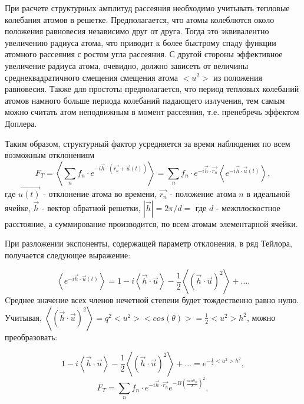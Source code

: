 
При расчете структурных амплитуд рассеяния необходимо учитывать
тепловые колебания атомов в решетке. Предполагается, что атомы колеблются около положения
равновесия независимо друг от друга. Тогда это эквивалентно увеличению радиуса атома,
что приводит к более быстрому спаду функции атомного рассеяния с ростом угла рассеяния.
С другой стороны эффективное увеличение радиуса атома, очевидно, должно зависеть от
величины среднеквадратичного смещения смещения атома  $<u^2>$ из положения равновесия.
Также для простоты предполагается, что период тепловых колебаний атомов намного больше периода
колебаний падающего излучения, тем самым можно считать атом неподвижным в момент рассеяния,
т.е. пренебречь эффектом Доплера.

Таким образом, структурный фактор усредняется за время наблюдения по всем возможным отклонениям
\begin{equation}
  F_T = \left\langle \sum_{n} f_n \cdot  e^{-i\vec {h} \cdot (\vec{r_n}+ \vec{u}(t))} \right\rangle =  \sum_{n} f_n \cdot  e^{-i\vec {h} \cdot \vec{r_n}}  \left\langle e^{-i \vec{h} \cdot \vec {u}(t)  } \right\rangle,
 \end{equation}
\noindent
где $\vec{u(t)}$ - отклонение атома во времени, $\vec{r_n}$ - положение атома $n$
в идеальной ячейке, $\vec{h}$ - вектор обратной решетки, $|\vec{h}| = 2 \pi / d = $ где $d$ - межплоскостное расстояние,
а суммирование производится, по всем атомам элементарной ячейки.

При разложении экспоненты, содержащей параметр отклонения, в ряд Тейлора, получается следующее выражение:

\begin{equation}
  \left\langle e^{-i \vec{h} \cdot \vec {u}(t)  } \right\rangle = 1 - i  \left\langle \vec{h} \cdot \vec {u} \right\rangle - \frac{1}{2} \left\langle (\vec{h} \cdot \vec {u})^2 \right\rangle+ \ldots .
 \end{equation}
\noindent
 Cреднее значение всех членов нечетной степени будет тождественно равно нулю.
Учитывая,  $ \left\langle (\vec{h} \cdot \vec {u})^2 \right\rangle = q^2 <u^2> <cos(\theta)> = \frac{1}{2}<u^2>h^2$, можно преобразовать:

\begin{equation}
1 - i  \left\langle \vec{h} \cdot \vec {u} \right\rangle - \frac{1}{2} \left\langle (\vec{h} \cdot \vec {u})^2 \right\rangle+ \ldots = e^{-\frac{1}{2} <u^2> h^2},
 \end{equation}
 \begin{equation}
   F_T =  \sum_{n} f_n \cdot  e^{-i\vec {h} \cdot \vec{r_n}}  e^{-B (\frac{sin\theta_B}{\lambda} )^2 },
  \end{equation}
\noindent

